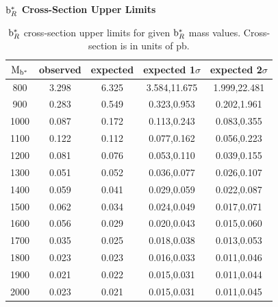\begin{table}
\begin{center}
\bf{$\mathrm{b}^{*}_R$ Cross-Section Upper Limits}\\
\begin{tabular}{c||c|c|c|c}
\hline
\hline
\bf{$\mathrm{M_{\mathrm{b}^{*}}}$} & \bf{observed}  & \bf{expected} & \bf{expected 1$\sigma$}  & \bf{expected 2$\sigma$} \\
\hline
\hline
800 & 3.298 & 6.325 & 3.584,11.675 & 1.999,22.481\\ 
900 & 0.283 & 0.549 & 0.323,0.953 & 0.202,1.961\\ 
1000 & 0.087 & 0.172 & 0.113,0.243 & 0.083,0.355\\ 
1100 & 0.122 & 0.112 & 0.077,0.162 & 0.056,0.223\\ 
1200 & 0.081 & 0.076 & 0.053,0.110 & 0.039,0.155\\ 
1300 & 0.051 & 0.052 & 0.036,0.077 & 0.026,0.107\\ 
1400 & 0.059 & 0.041 & 0.029,0.059 & 0.022,0.087\\ 
1500 & 0.062 & 0.034 & 0.024,0.049 & 0.017,0.071\\ 
1600 & 0.056 & 0.029 & 0.020,0.043 & 0.015,0.060\\ 
1700 & 0.035 & 0.025 & 0.018,0.038 & 0.013,0.053\\ 
1800 & 0.023 & 0.023 & 0.016,0.033 & 0.011,0.046\\ 
1900 & 0.021 & 0.022 & 0.015,0.031 & 0.011,0.044\\ 
2000 & 0.023 & 0.021 & 0.015,0.031 & 0.011,0.045\\ 
\hline
\end{tabular}
\end{center}
\caption{$\mathrm{b}^{*}_R$ cross-section upper limits for given $\mathrm{b}^{*}_R$ mass values.  Cross-section is in units of pb.}
\label{table:bsupperxsecR}
\end{table}

